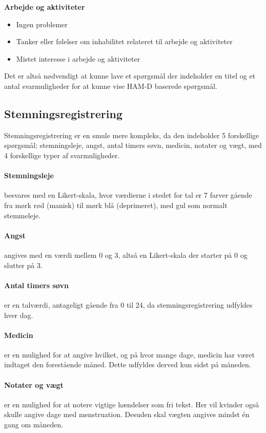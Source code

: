 \textbf{Arbejde og aktiviteter}
\begin{itemize}
\item Ingen problemer
\item Tanker eller følelser om inhabilitet relateret til arbejde og aktiviteter
\item Mistet interesse i arbejde og aktiviteter 
\end{itemize}

Det er altså nødvendigt at kunne lave et spørgsmål der indeholder en titel og et antal svarmuligheder for at kunne vise HAM-D baserede spørgsmål.

\subsection{Stemningsregistrering} 
Stemningsregistrering er en smule mere kompleks, da den indeholder 5 forskellige spørgsmål; stemningsleje, angst, antal timers søvn, medicin, notater og vægt, med 4 forskellige typer af svarmuligheder.

\paragraph{Stemningsleje} besvares med en Likert-skala, hvor værdierne i stedet for tal er 7 farver gående fra mørk rød (manisk) til mørk blå (deprimeret), med gul som normalt stemmeleje.

\paragraph{Angst} angives med en værdi mellem 0 og 3, altså en Likert-skala der starter på 0 og slutter på 3.

\paragraph{Antal timers søvn} er en talværdi, antageligt gående fra 0 til 24, da stemningsregistrering udfyldes hver dag.

\paragraph{Medicin} er en mulighed for at angive hvilket, og på hvor mange dage, medicin har været indtaget den forestående måned.
Dette udfyldes derved kun sidst på måneden.

\paragraph{Notater og vægt} er en mulighed for at notere vigtige hændelser som fri tekst.
Her vil kvinder også skulle angive dage med menstruation.
Desuden skal vægten angives mindst én gang om måneden.

